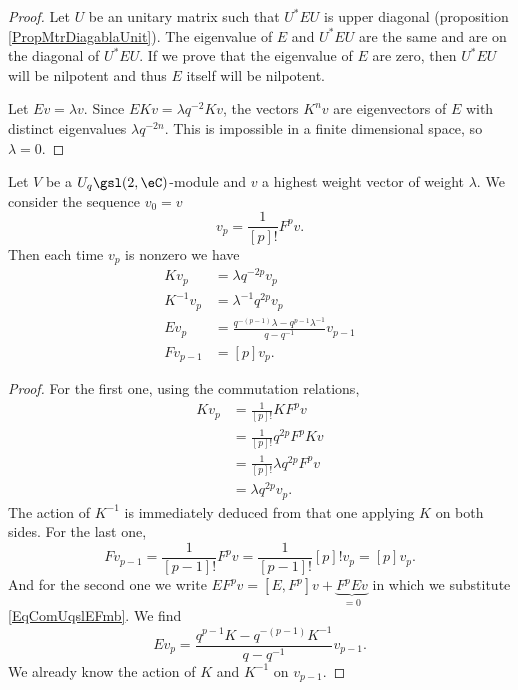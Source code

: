 \begin{proof}
    Let \( U\) be an unitary matrix such that \( U^*EU\) is upper diagonal (proposition \ref{PropMtrDiagablaUnit}). The eigenvalue of \( E\) and \( U^*EU\) are the same and are on the diagonal of \( U^*EU\). If we prove that the eigenvalue of \( E\) are zero, then \( U^*EU\) will be nilpotent and thus \( E\) itself will be nilpotent.

    Let \( Ev=\lambda v\). Since \( EKv=\lambda q^{-2}Kv\), the vectors \( K^nv\) are eigenvectors of \( E\) with distinct eigenvalues \( \lambda q^{-2n}\). This is impossible in a finite dimensional space, so \( \lambda=0\).
\end{proof}

\begin{proposition}
    Let \( V\) be a \( U_q\gsl(2,\eC)\)-module and \( v\) a highest weight vector of weight \( \lambda\). We consider the sequence \( v_0=v\)
    \begin{equation}
        v_p=\frac{1}{  [p]! }F^pv.
    \end{equation}
    Then each time \( v_p\) is nonzero we have
    \begin{subequations}        \label{subeqsActionUqsldcVp}
        \begin{align}
            K v_p&=\lambda q^{-2p}v_p       \label{EqKvpqdpvp}\\
            K^{-1} v_{p}&=\lambda^{-1}q^{2p}v_p\\
            E v_p&=\frac{ q^{-(p-1)}\lambda-q^{p-1}\lambda^{-1} }{ q-q^{-1} }v_{p-1}\\
            F v_{p-1}&=[p]v_p.
        \end{align}
    \end{subequations}
\end{proposition}

\begin{proof}
    For the first one, using the commutation relations,
    \begin{subequations}
        \begin{align}
            Kv_p&=\frac{1}{ [p]! }KF^pv\\
            &=\frac{1}{ [p]! }q^{2p}F^pKv\\
            &=\frac{ 1 }{ [p]! }\lambda q^{2p}F^pv\\
            &=\lambda q^{2p}v_p.
        \end{align}
    \end{subequations}
    The action of \( K^{-1}\) is immediately deduced from that one applying \( K\) on both sides. For the last one,
    \begin{equation}
        Fv_{p-1}=\frac{1}{ [p-1]! }F^pv=\frac{1}{ [p-1]! }[p]!v_p=[p]v_p.
    \end{equation}
    And for the second one we write \( EF^pv= [E,F^p]v+\underbrace{F^pEv}_{=0}\) in which we substitute \eqref{EqComUqslEFmb}.  We find
    \begin{equation}
        Ev_p=\frac{ q^{p-1}K-q^{-(p-1)}K^{-1} }{ q-q^{-1} }v_{p-1}.
    \end{equation}
    We already know the action of \( K\) and \( K^{-1}\) on \( v_{p-1}\).
\end{proof}

